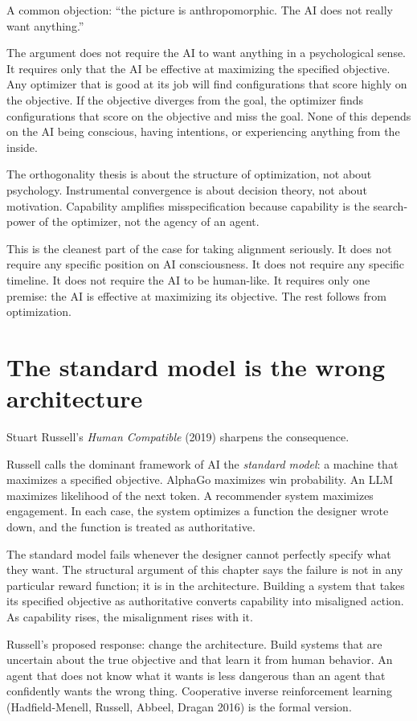A common objection: ``the picture is anthropomorphic. The AI does not really want anything.''

The argument does not require the AI to want anything in a psychological sense. It requires only that the AI be effective at maximizing the specified objective. Any optimizer that is good at its job will find configurations that score highly on the objective. If the objective diverges from the goal, the optimizer finds configurations that score on the objective and miss the goal. None of this depends on the AI being conscious, having intentions, or experiencing anything from the inside.

The orthogonality thesis is about the structure of optimization, not about psychology. Instrumental convergence is about decision theory, not about motivation. Capability amplifies misspecification because capability is the search-power of the optimizer, not the agency of an agent.

This is the cleanest part of the case for taking alignment seriously. It does not require any specific position on AI consciousness. It does not require any specific timeline. It does not require the AI to be human-like. It requires only one premise: the AI is effective at maximizing its objective. The rest follows from optimization.

\section*{The standard model is the wrong architecture}

Stuart Russell's \emph{Human Compatible} (2019) sharpens the consequence.

Russell calls the dominant framework of AI the \emph{standard model}: a machine that maximizes a specified objective. AlphaGo maximizes win probability. An LLM maximizes likelihood of the next token. A recommender system maximizes engagement. In each case, the system optimizes a function the designer wrote down, and the function is treated as authoritative.

The standard model fails whenever the designer cannot perfectly specify what they want. The structural argument of this chapter says the failure is not in any particular reward function; it is in the architecture. Building a system that takes its specified objective as authoritative converts capability into misaligned action. As capability rises, the misalignment rises with it.

Russell's proposed response: change the architecture. Build systems that are uncertain about the true objective and that learn it from human behavior. An agent that does not know what it wants is less dangerous than an agent that confidently wants the wrong thing. Cooperative inverse reinforcement learning (Hadfield-Menell, Russell, Abbeel, Dragan 2016) is the formal version.

